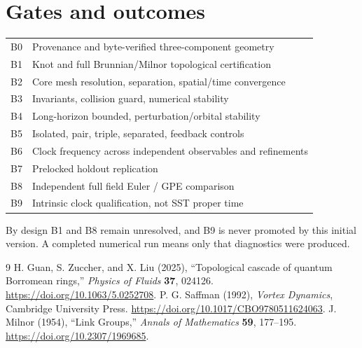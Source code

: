 \documentclass[11pt,a4paper]{article}
\begin{document}
\section{Gates and outcomes}
\begin{tabular}{ll}
\toprule
B0 & Provenance and byte-verified three-component geometry \\
B1 & Knot and full Brunnian/Milnor topological certification \\
B2 & Core mesh resolution, separation, spatial/time convergence \\
B3 & Invariants, collision guard, numerical stability \\
B4 & Long-horizon bounded, perturbation/orbital stability \\
B5 & Isolated, pair, triple, separated, feedback controls \\
B6 & Clock frequency across independent observables and refinements \\
B7 & Prelocked holdout replication \\
B8 & Independent full field Euler / GPE comparison \\
B9 & Intrinsic clock qualification, not SST proper time \\
\bottomrule
\end{tabular}
\par\medskip
By design B1 and B8 remain unresolved, and B9 is never promoted by this initial version. A completed numerical run means only that diagnostics were produced.
\begin{thebibliography}{9}
 H. Guan, S. Zuccher, and X. Liu (2025), ``Topological cascade of quantum Borromean rings,'' \emph{Physics of Fluids} \textbf{37}, 024126. \url{https://doi.org/10.1063/5.0252708}.
 P. G. Saffman (1992), \emph{Vortex Dynamics}, Cambridge University Press. \url{https://doi.org/10.1017/CBO9780511624063}.
 J. Milnor (1954), ``Link Groups,'' \emph{Annals of Mathematics} \textbf{59}, 177--195. \url{https://doi.org/10.2307/1969685}.
\end{thebibliography}
\end{document}

